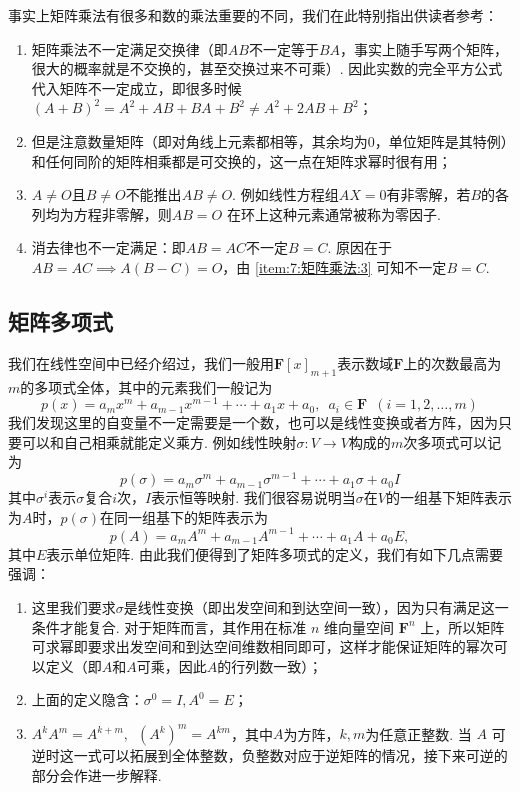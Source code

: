事实上矩阵乘法有很多和数的乘法重要的不同，我们在此特别指出供读者参考：
\begin{enumerate}[label=(\arabic*)]
    \item 矩阵乘法不一定满足交换律（即$AB$不一定等于$BA$，事实上随手写两个矩阵，很大的概率就是不交换的，甚至交换过来不可乘）. 因此实数的完全平方公式代入矩阵不一定成立，即很多时候$(A+B)^2=A^2+AB+BA+B^2\neq A^2+2AB+B^2$；

    \item 但是注意数量矩阵（即对角线上元素都相等，其余均为0，单位矩阵是其特例）和任何同阶的矩阵相乘都是可交换的，这一点在矩阵求幂时很有用；

    \item \label{item:7:矩阵乘法:3}
          $A\neq O$且$B\neq O$不能推出$AB\neq O$. 例如线性方程组$AX = 0$有非零解，若$B$的各列均为方程非零解，则$AB = O$ 在环上这种元素通常被称为零因子.

    \item 消去律也不一定满足：即$AB = AC$不一定$B = C$. 原因在于$AB=AC \implies A(B-C)=O$，由 \ref*{item:7:矩阵乘法:3} 可知不一定$B = C$.
\end{enumerate}

\subsection{矩阵多项式}

我们在线性空间中已经介绍过，我们一般用$\mathbf{F}[x]_{m+1}$表示数域$\mathbf{F}$上的次数最高为$m$的多项式全体，其中的元素我们一般记为
\[p(x)=a_mx^m+a_{m-1}x^{m-1}+\cdots+a_1x+a_0,\enspace a_i\in\mathbf{F}\enspace(i=1,2,\ldots,m)\]
我们发现这里的自变量不一定需要是一个数，也可以是线性变换或者方阵，因为只要可以和自己相乘就能定义乘方. 例如线性映射$\sigma:V\to V$构成的$m$次多项式可以记为
\[p(\sigma)=a_m\sigma^m+a_{m-1}\sigma^{m-1}+\cdots+a_1\sigma+a_0I\]
其中$\sigma^i$表示$\sigma$复合$i$次，$I$表示恒等映射. 我们很容易说明当$\sigma$在$V$的一组基下矩阵表示为$A$时，$p(\sigma)$在同一组基下的矩阵表示为
\[p(A)=a_mA^m+a_{m-1}A^{m-1}+\cdots+a_1A+a_0E,\]
其中$E$表示单位矩阵. 由此我们便得到了矩阵多项式的定义，我们有如下几点需要强调：
\begin{enumerate}
    \item 这里我们要求$\sigma$是线性变换（即出发空间和到达空间一致），因为只有满足这一条件才能复合. 对于矩阵而言，其作用在标准 $n$ 维向量空间 $\mathbf{F}^n$ 上，所以矩阵可求幂即要求出发空间和到达空间维数相同即可，这样才能保证矩阵的幂次可以定义（即$A$和$A$可乘，因此$A$的行列数一致）；

    \item 上面的定义隐含：$\sigma^0 = I, A^0=E$；

    \item $A^kA^m=A^{k+m},\enspace (A^k)^m=A^{km}$，其中$A$为方阵，$k,m$为任意正整数. 当 $A$ 可逆时这一式可以拓展到全体整数，负整数对应于逆矩阵的情况，接下来可逆的部分会作进一步解释.
\end{enumerate}

